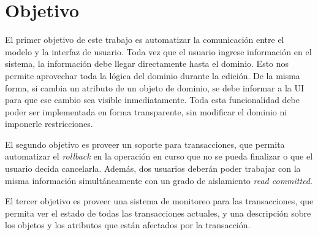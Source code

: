\section{Objetivo}
\label{Objetivo}
El primer objetivo de este trabajo es automatizar la comunicación entre el
modelo y la interfaz de usuario.
Toda vez que el usuario ingrese información en el sistema, la
información debe llegar directamente hasta el dominio. Esto nos permite
aprovechar toda la lógica del dominio durante la edición.
De la misma forma, si cambia un atributo de un objeto de dominio, se debe
informar a la UI para que ese cambio sea visible
inmediatamente.
Toda esta funcionalidad debe poder ser implementada en forma transparente,
sin modificar el dominio ni imponerle restricciones.

El segundo objetivo es proveer un soporte para transacciones, que
permita automatizar el \emph{rollback} en la operación en curso que no se pueda
finalizar o que el usuario decida cancelarla.
Además, dos usuarios deberán poder trabajar con la misma información
simultáneamente con un grado de aislamiento \emph{read committed}.

El tercer objetivo es proveer una sistema de monitoreo para las transacciones,
que permita ver el estado de todas las transacciones actuales, y una descripción
sobre los objetos y los atributos que están afectados por la transacción.
